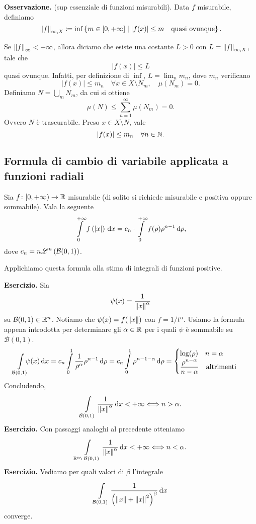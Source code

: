 \documentclass[a4paper, 12pt]{report}
\begin{document}
\textbf{Osservazione.} (sup essenziale di funzioni misurabili).
Data $f$ misurabile, definiamo
$$
	\left\lVert  f  \right\rVert_{\infty, X} \coloneqq \inf \left\{ m \in [0,+\infty] \;\middle|\; \left| f(x) \right| \leq m \quad \text{quasi ovunque}  \right\}.
$$

Se $\left\lVert  f  \right\rVert_{\infty} < + \infty$, allora diciamo che esiste una costante $L > 0$ con $L = \left\lVert  f  \right\rVert_{\infty, X}$, tale che 
$$
	\left| f(x) \right| \leq L
$$
quasi ovunque. 
Infatti, per definizione di $\inf$, $L = \lim_n m_n$, dove $m_n$ verificano
$$
	\left| f(x) \right| \leq m_n \quad \forall x \in X \setminus N_m, \quad \mu(N_m) = 0.
$$
Definiamo $N = \bigcup_{m} N_m$, da cui si ottiene
$$
	\mu(N) \leq \sum_{n=1}^{\infty} \mu (N_m) = 0. 
$$
Ovvero $N$ è trascurabile.
Preso $x \in X \setminus N$, vale
$$
	\left| f(x) \right| \leq m_n \quad \forall n \in \mathbb N.
$$


\subsection*{Formula di cambio di variabile applicata a funzioni radiali}

Sia $f \colon [0,+\infty) \to \mathbb R$ misurabile (di solito si richiede misurabile e positiva oppure sommabile).
Vala la seguente
$$
	\int\limits_{\mathclap{0}}^{+\infty} f\left( \left| x \right| \right) \dd x = c_n \cdot \int\limits_{\mathclap{0}}^{+\infty} f(\rho) \rho^{n-1} \dd \rho,
$$
dove $\displaystyle c_n = n \mathscr L^n \left( \mathcal{B}(0,1) \right)$.

Applichiamo questa formula alla stima di integrali di funzioni positive.

\textbf{Esercizio.}
Sia
$$
	\psi (x) = \frac{1}{\left\lVert  x  \right\rVert^{\alpha}}
$$
su $\mathcal{B}(0,1) \in \mathbb R^n$. Notiamo che $\psi(x) = f(\left\lVert  x  \right\rVert)$ con $f = 1 / t^\alpha$.
Usiamo la formula appena introdotta per determinare gli $\alpha \in \mathbb R$ per i quali $\psi$ è sommabile su $\mathcal{B}(0,1)$.
%
$$
\int\limits_{\mathclap{\mathcal{B}(0,1)}}^{} \psi(x) \dd x 
= c_n \int\limits_{\mathclap{0}}^{1} \frac{1}{\rho^\alpha} \rho^{n -1} \dd \rho 
= c_n \int\limits_{\mathclap{0}}^{1} \rho^{n-1-\alpha} \dd \rho =
\begin{cases}
	\log (\rho) \quad n = \alpha \\
	\dfrac{\rho^{n-\alpha}}{n - \alpha} \quad \text{altrimenti} 
\end{cases} 
$$
%
Concludendo,
%
$$
	\int\limits_{\mathcal{B}(0,1)}^{} \frac{1}{\left\lVert  x  \right\rVert^\alpha} \,\mathrm{d} x < + \infty \Longleftrightarrow n > \alpha.
$$
%
\textbf{Esercizio.}
Con passaggi analoghi al precedente otteniamo
%
$$
	\int\limits_{\R^n \setminus \; \mathcal{B}(0,1)}^{} \frac{1}{\norm{ x }^\alpha} \dd x < + \infty \longiff n < \alpha.
$$
%
\textbf{Esercizio.}
Vediamo per quali valori di $\beta$ l'integrale
%
$$
	\int\limits_{\mathcal{B}(0,1)}^{} \frac{1}{\left( \left\lVert  x  \right\rVert + \left\lVert  x  \right\rVert^2 \right)^\beta} \,\mathrm{d} x
$$
%
converge.
\end{document}
